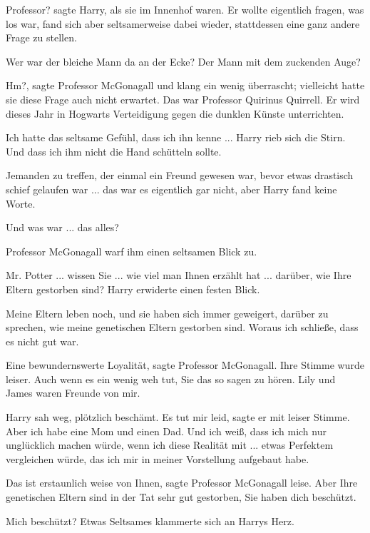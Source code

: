 \glqq{}Professor?\grqq{} sagte Harry, als sie im Innenhof waren. Er wollte
eigentlich fragen, was los war, fand sich aber seltsamerweise dabei wieder,
stattdessen eine ganz andere Frage zu stellen.

\glqq{}Wer war der bleiche Mann da an der Ecke? Der Mann mit dem zuckenden
Auge?\grqq{}

\glqq{}Hm?\grqq{}, sagte Professor McGonagall und klang ein wenig überrascht;
vielleicht hatte sie diese Frage auch nicht erwartet. \glqq{}Das war Professor
Quirinus Quirrell. Er wird dieses Jahr in Hogwarts Verteidigung gegen die
dunklen Künste unterrichten.\grqq{}

\glqq{}Ich hatte das seltsame Gefühl, dass ich ihn kenne ...\grqq{} Harry rieb
sich die Stirn. \glqq{}Und dass ich ihm nicht die Hand schütteln sollte.\grqq{}

Jemanden zu treffen, der einmal ein Freund gewesen war, bevor etwas drastisch
schief gelaufen war ... das war es eigentlich gar nicht, aber Harry fand keine
Worte.

\glqq{}Und was war ... das alles?\grqq{}

Professor McGonagall warf ihm einen seltsamen Blick zu.

\glqq{}Mr. Potter ... wissen Sie ... wie viel man Ihnen erzählt hat ... darüber, wie
Ihre Eltern gestorben sind?\grqq{} Harry erwiderte einen festen Blick.

\glqq{}Meine Eltern leben noch, und sie haben sich immer geweigert, darüber zu
sprechen, wie meine genetischen Eltern gestorben sind. Woraus ich schließe, dass
es nicht gut war.\grqq{}

\glqq{}Eine bewundernswerte Loyalität\grqq{}, sagte Professor McGonagall. Ihre
Stimme wurde leiser. \glqq{}Auch wenn es ein wenig weh tut, Sie das so sagen zu
hören. Lily und James waren Freunde von mir.\grqq{}

Harry sah weg, plötzlich beschämt. \glqq{}Es tut mir leid\grqq{}, sagte er mit
leiser Stimme. \glqq{}Aber ich habe eine Mom und einen Dad. Und ich weiß, dass
ich mich nur unglücklich machen würde, wenn ich diese Realität mit ... etwas
Perfektem vergleichen würde, das ich mir in meiner Vorstellung aufgebaut
habe.\grqq{}

\glqq{}Das ist erstaunlich weise von Ihnen\grqq{}, sagte Professor McGonagall
leise. \glqq{}Aber Ihre genetischen Eltern sind in der Tat sehr gut gestorben,
Sie haben dich beschützt.\grqq{}

Mich beschützt? Etwas Seltsames klammerte sich an Harrys Herz.

